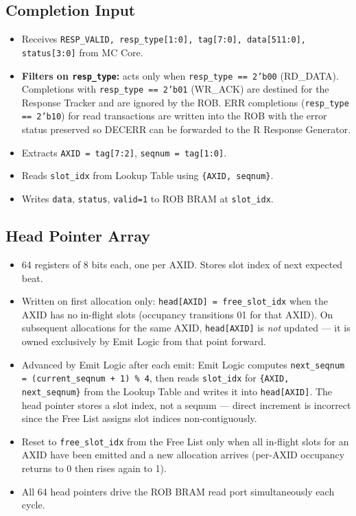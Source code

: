 \subsection{Completion Input}
\begin{itemize}[noitemsep]
  \item Receives \texttt{RESP\_VALID, resp\_type[1:0], tag[7:0], data[511:0], status[3:0]}
        from MC Core.
  \item \textbf{Filters on \texttt{resp\_type}:} acts only when
        \texttt{resp\_type == 2'b00} (RD\_DATA). Completions with
        \texttt{resp\_type == 2'b01} (WR\_ACK) are destined for the Response Tracker
        and are ignored by the ROB. ERR completions (\texttt{resp\_type == 2'b10}) for
        read transactions are written into the ROB with the error status preserved so
        DECERR can be forwarded to the R Response Generator.
  \item Extracts \texttt{AXID = tag[7:2]}, \texttt{seqnum = tag[1:0]}.
  \item Reads \texttt{slot\_idx} from Lookup Table using \texttt{\{AXID, seqnum\}}.
  \item Writes \texttt{data}, \texttt{status}, \texttt{valid=1} to ROB BRAM at \texttt{slot\_idx}.
\end{itemize}

\subsection{Head Pointer Array}
\begin{itemize}[noitemsep]
  \item 64 registers of 8 bits each, one per AXID. Stores slot index of next expected beat.
  \item Written on first allocation only: \texttt{head[AXID] = free\_slot\_idx} when the
        AXID has no in-flight slots (occupancy transitions 0\textrightarrow{}1 for that AXID).
        On subsequent allocations for the same AXID, \texttt{head[AXID]} is \emph{not} updated
        — it is owned exclusively by Emit Logic from that point forward.
  \item Advanced by Emit Logic after each emit: Emit Logic computes
        \texttt{next\_seqnum = (current\_seqnum + 1) \% 4}, then reads
        \texttt{slot\_idx} for \texttt{\{AXID, next\_seqnum\}} from the Lookup Table
        and writes it into \texttt{head[AXID]}. The head pointer stores a slot index,
        not a seqnum — direct increment is incorrect since the Free List assigns slot
        indices non-contiguously.
  \item Reset to \texttt{free\_slot\_idx} from the Free List only when all in-flight slots
        for an AXID have been emitted and a new allocation arrives (per-AXID occupancy
        returns to 0 then rises again to 1).
  \item All 64 head pointers drive the ROB BRAM read port simultaneously each cycle.
\end{itemize}

